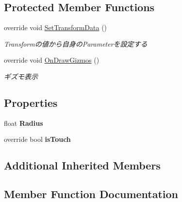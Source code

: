 \subsection*{Protected Member Functions}
\begin{DoxyCompactItemize}
\item 
override void \hyperlink{class_touch_area_circle_ae8c15b781f6ddee17bda483bd9c8b0a0}{Set\+Transform\+Data} ()
\begin{DoxyCompactList}\small\item\em Transformの値から自身の\+Parameterを設定する \end{DoxyCompactList}\item 
override void \hyperlink{class_touch_area_circle_a42b59d970df599ef088e0cdbc9a90329}{On\+Draw\+Gizmos} ()
\begin{DoxyCompactList}\small\item\em ギズモ表示 \end{DoxyCompactList}\end{DoxyCompactItemize}
\subsection*{Properties}
\begin{DoxyCompactItemize}
\item 
float {\bfseries Radius}\hypertarget{class_touch_area_circle_ab7c2ca7c94f0670f8f5ebcf4d48c0396}{}\label{class_touch_area_circle_ab7c2ca7c94f0670f8f5ebcf4d48c0396}

\item 
override bool {\bfseries is\+Touch}\hypertarget{class_touch_area_circle_aee7187303bd62a20fbe64302d3f6fff6}{}\label{class_touch_area_circle_aee7187303bd62a20fbe64302d3f6fff6}

\end{DoxyCompactItemize}
\subsection*{Additional Inherited Members}


\subsection{Member Function Documentation}
